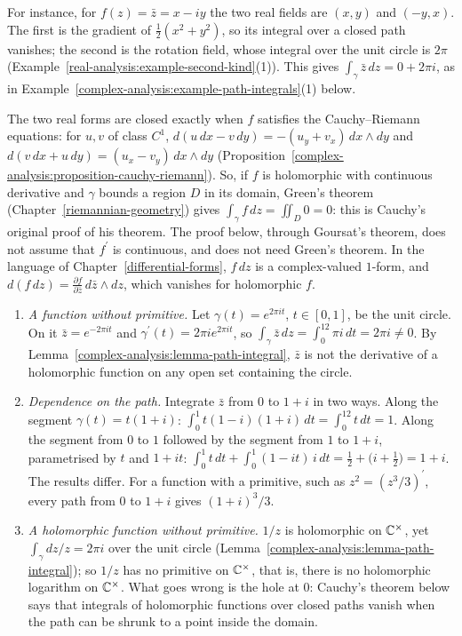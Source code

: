 For instance, for $f(z) = \bar z = x - iy$ the two real fields are $(x, y)$ and $(-y, x)$. The first is the gradient of $\frac12(x^2 + y^2)$, so its integral over a closed path vanishes; the second is the rotation field,
whose integral over the unit circle is $2\pi$ (Example~\ref{real-analysis:example-second-kind}(1)). This gives $\int_\gamma\bar z\,dz = 0 + 2\pi i$, as in Example~\ref{complex-analysis:example-path-integrals}(1) below.

\begin{remark}\label{complex-analysis:remark-cauchy-green}
The two real forms are closed exactly when $f$ satisfies the Cauchy--Riemann equations: for $u, v$ of class $C^1$, $d(u\,dx - v\,dy) = -(u_y + v_x)\,dx \wedge dy$ and $d(v\,dx + u\,dy) = (u_x - v_y)\,dx \wedge dy$
(Proposition~\ref{complex-analysis:proposition-cauchy-riemann}). So, if $f$ is holomorphic with continuous derivative and $\gamma$ bounds a region $D$ in its domain, Green's theorem (Chapter~\ref{riemannian-geometry})
gives $\int_\gamma f\,dz = \iint_D0 = 0$: this is Cauchy's original proof of his theorem. The proof below, through Goursat's theorem, does not assume that $f^{\prime}$ is continuous, and does not need Green's
theorem. In the language of Chapter~\ref{differential-forms}, $f\,dz$ is a complex-valued $1$-form, and $d(f\,dz) = \frac{\partial f}{\partial\bar z}\,d\bar z \wedge dz$, which vanishes for holomorphic $f$.
\end{remark}

\begin{example}\label{complex-analysis:example-path-integrals}
\begin{enumerate}
\item \emph{A function without primitive.} Let $\gamma(t) = e^{2\pi it}$, $t \in [0, 1]$, be the unit circle. On it $\bar z = e^{-2\pi it}$ and $\gamma^{\prime}(t) = 2\pi ie^{2\pi it}$, so
$\int_\gamma\bar z\,dz = \int_0^12\pi i\,dt = 2\pi i \neq 0$. By Lemma~\ref{complex-analysis:lemma-path-integral}, $\bar z$ is not the derivative of a holomorphic function on any open set containing the
circle.
\item \emph{Dependence on the path.} Integrate $\bar z$ from $0$ to $1 + i$ in two ways. Along the segment $\gamma(t) = t(1 + i)$: $\int_0^1t(1 - i)(1 + i)\,dt = \int_0^12t\,dt = 1$. Along the segment from
$0$ to $1$ followed by the segment from $1$ to $1 + i$, parametrised by $t$ and $1 + it$: $\int_0^1t\,dt + \int_0^1(1 - it)\,i\,dt = \frac12 + \bigl(i + \frac12\bigr) = 1 + i$. The results differ. For a
function with a primitive, such as $z^2 = (z^3/3)^{\prime}$, every path from $0$ to $1 + i$ gives $(1 + i)^3/3$.
\item \emph{A holomorphic function without primitive.} $1/z$ is holomorphic on $\mathbb{C}^\times$, yet $\int_\gamma dz/z = 2\pi i$ over the unit circle (Lemma~\ref{complex-analysis:lemma-path-integral}); so $1/z$ has no
primitive on $\mathbb{C}^\times$, that is, there is no holomorphic logarithm on $\mathbb{C}^\times$. What goes wrong is the hole at $0$: Cauchy's theorem below says that integrals of holomorphic functions over closed
paths vanish when the path can be shrunk to a point inside the domain.
\end{enumerate}
\end{example}

